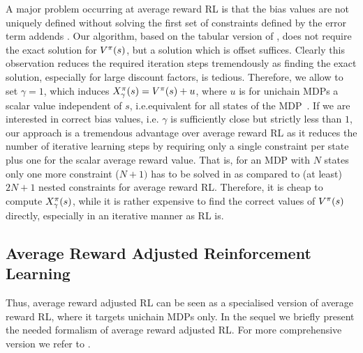 \documentclass[envcountsame]{llncs}
\begin{document}
A major problem occurring at average reward RL is that the bias values are not uniquely defined
without solving the first set of constraints defined by the error term addends
\citep[see][p.346]{Puterman94,Mahadevan96_SensitiveDiscountOptimalityUnifyingDiscountedAndAverageRewardReinforcementLearning}.
%
Our algorithm, based on the tabular version of \citet{schneckenreither2020average}, does not require
the exact solution for \(V^{\pi}(s)\), but a solution which is offset suffices. Clearly this
observation reduces the required iteration steps tremendously as finding the exact solution,
especially for large discount factors, is tedious. Therefore, we allow to set \(\gamma = 1\), which
induces \(X_{\gamma}^{\pi}(s) = V^{\pi}(s) + u\), where \(u\) is for unichain MDPs a scalar value
independent of \(s\), i.e.\@ equivalent for all states of the MDP~\cite[p.346]{Puterman94}.
%
%
If we are interested in correct bias values, i.e. \(\gamma\) is sufficiently close but strictly less
than \(1\), our approach is a tremendous advantage over average reward RL as it reduces the number
of iterative learning steps by requiring only a single constraint per state plus one for the scalar
average reward value. That is, for an MDP with \(N\) states only one more constraint (\(N+1)\) has
to be solved in \ARA{} as compared to (at least) \(2N+1\) nested constraints for average reward RL.
Therefore, it is cheap to compute \(X_{\gamma}^{\pi}(s)\), while it is rather expensive to find
the correct values of \(V^{\pi}(s)\) directly, especially in an iterative manner as RL is.

\subsection{Average Reward Adjusted Reinforcement Learning}
\label{subsec:Average_Reward_Adjusted_Reinforcement_Learning}

Thus, average reward adjusted RL can be seen as a specialised version of average reward RL, where it
targets unichain MDPs only. In the sequel we briefly present the needed formalism of average reward
adjusted RL. For more comprehensive version we refer to \citet{schneckenreither2020average}.
\end{document}
